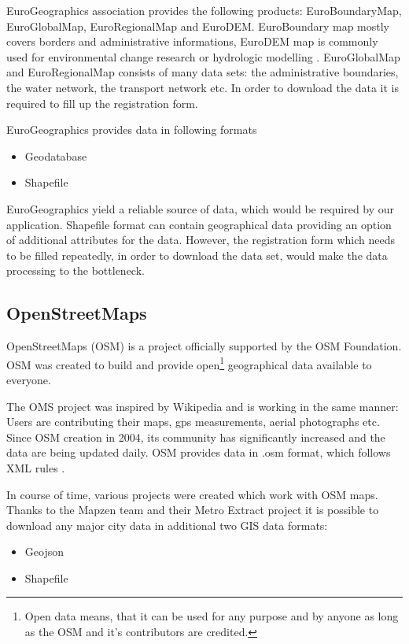 \documentclass[thesis=M,english]{FITthesis}[2012/10/20]
\begin{document}
EuroGeographics association provides the following products: EuroBoundaryMap, EuroGlobalMap, EuroRegionalMap and EuroDEM.
EuroBoundary map mostly covers borders and administrative informations, EuroDEM map is commonly used for environmental change research or hydrologic modelling \cite{Euro16}.
EuroGlobalMap and EuroRegionalMap consists of many data sets: the administrative boundaries, the water network, the transport network etc. 
In order to download the data it is required to fill up the registration form.

EuroGeographics provides data in following formats

\begin{itemize}
\item Geodatabase
\item Shapefile
\end{itemize}

EuroGeographics yield a reliable source of data, which would be required by our application. Shapefile format can contain geographical data providing an option of additional attributes for the data. However, the registration form which needs to be filled repeatedly, in order to download the data set, would make the data processing to the bottleneck.

\subsection{OpenStreetMaps}
\label{subsec:DA_OSM}
OpenStreetMaps (OSM) is a project officially supported by the OSM Foundation.
OSM was created to build and provide open\footnote{Open data means, that it can be used for any purpose and by anyone as long as the OSM and it's contributors are credited.} geographical data available to everyone.  

The OMS project was inspired by Wikipedia and is working in the same manner: Users are contributing their maps, gps measurements, aerial photographs etc. Since OSM creation in 2004, its community has significantly increased and the data are being updated daily.
OSM provides data in .osm format, which follows XML rules \cite{OSM17}.

In course of time, various projects were created which work with OSM maps.
Thanks to the Mapzen team and their Metro Extract project it is possible to download any major city data in additional two GIS data formats\cite{OSM17}:
\begin{itemize}
\item Geojson
\item Shapefile
\end{itemize}
\end{document}
